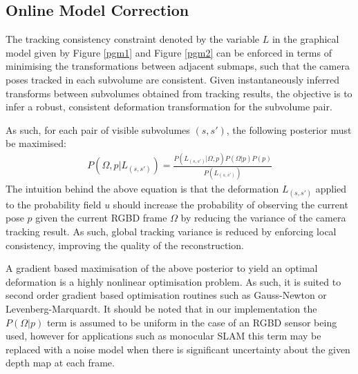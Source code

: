 \subsection{Online Model Correction}
\label{subsec:onlinemodelcorrection}

The tracking consistency constraint denoted by the variable $L$ in the graphical model given by Figure \ref{pgm1} and Figure \ref{pgm2} can 
be enforced in terms of minimising the transformations between adjacent submaps, such that the camera poses tracked in each subvolume are consistent.  
Given instantaneously inferred transforms between subvolumes obtained from tracking results, 
the objective is to infer a robust, consistent deformation transformation for the subvolume pair.

As such, for each pair of visible subvolumes $(s, s')$, the following posterior must be maximised:
\begin{equation}
\begin{split}
P(\Omega, p | L_{(s, s')}) = \frac{P(L_{(s, s')} | \Omega, p) P(\Omega | p)P(p)}
{P(L_{(s, s')})}
\end{split}
\end{equation}
The intuition behind the above equation is that the deformation $L_{(s, s')}$ applied to the probability field $u$ should 
increase the probability of observing the current pose $p$ given the current RGBD frame $\Omega$ by reducing the 
variance of the camera tracking result. As such, global tracking variance is reduced by enforcing local consistency, improving the quality 
of the reconstruction.

A gradient based maximisation of the above posterior to yield an optimal deformation is a highly nonlinear optimisation problem. As such, it is suited 
to second order gradient based optimisation routines such as Gauss-Newton or Levenberg-Marquardt.
It should be noted that in our implementation the $P(\Omega | p)$ term is assumed to be uniform in the case of an 
RGBD sensor being used, however for applications such as monocular SLAM this term may be replaced with a noise model when there is 
significant uncertainty about the given depth map at each frame.

